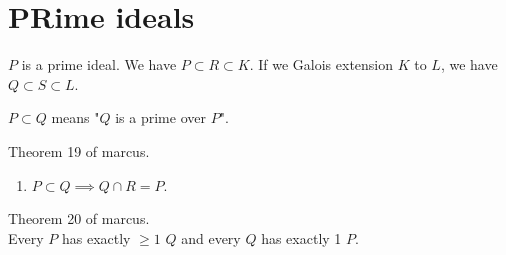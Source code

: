 \documentclass[11pt]{article}
\begin{document}
\section{PRime ideals}
$P$ is a prime ideal. We have $P \subset R \subset K$. If we Galois extension $K$ to $L$, we have $Q \subset S \subset L$.
\begin{definition}
    $P \subset Q$ means "$Q$ is a prime over $P$".
\end{definition}
\begin{theorem}
    Theorem 19 of marcus.
    \begin{enumerate}
        \item $P \subset Q \implies Q \cap R = P$.
    \end{enumerate}
    
\end{theorem}
\begin{theorem}
    Theorem 20 of marcus.\\
    Every $P$ has exactly $\ge 1$ $Q$ and every $Q$ has exactly 1 $P$.
\end{theorem}
\end{document}
